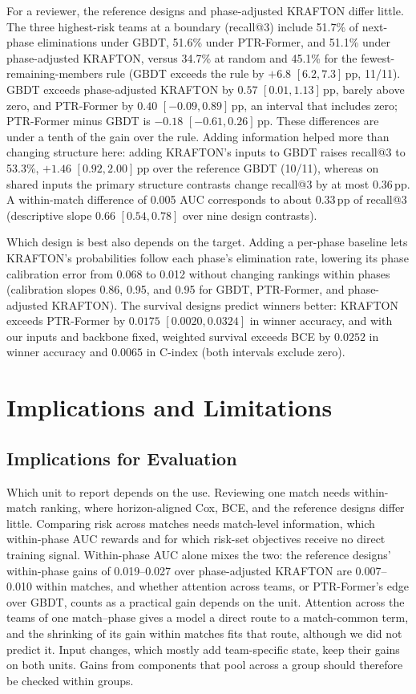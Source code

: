 \documentclass[sigconf,anonymous]{acmart}
\begin{document}
For a reviewer, the reference designs and phase-adjusted KRAFTON differ little. The three highest-risk teams at a boundary (recall@3) include 51.7\% of next-phase eliminations under GBDT, 51.6\% under PTR-Former, and 51.1\% under phase-adjusted KRAFTON, versus 34.7\% at random and 45.1\% for the fewest-remaining-members rule (GBDT exceeds the rule by $+6.8$ $[6.2,\allowbreak 7.3]$\,pp, 11/11). GBDT exceeds phase-adjusted KRAFTON by $0.57$ $[0.01,\allowbreak 1.13]$\,pp, barely above zero, and PTR-Former by $0.40$ $[-0.09,\allowbreak 0.89]$\,pp, an interval that includes zero; PTR-Former minus GBDT is $-0.18$ $[-0.61,\allowbreak 0.26]$\,pp. These differences are under a tenth of the gain over the rule. Adding information helped more than changing structure here: adding KRAFTON's inputs to GBDT raises recall@3 to 53.3\%, $+1.46$ $[0.92,\allowbreak 2.00]$\,pp over the reference GBDT (10/11), whereas on shared inputs the primary structure contrasts change recall@3 by at most 0.36\,pp. A within-match difference of 0.005 AUC corresponds to about 0.33\,pp of recall@3 (descriptive slope 0.66 $[0.54,\allowbreak 0.78]$ over nine design contrasts).

Which design is best also depends on the target. Adding a per-phase baseline lets KRAFTON's probabilities follow each phase's elimination rate, lowering its phase calibration error from 0.068 to 0.012 without changing rankings within phases (calibration slopes 0.86, 0.95, and 0.95 for GBDT, PTR-Former, and phase-adjusted KRAFTON). The survival designs predict winners better: KRAFTON exceeds PTR-Former by $0.0175$ $[0.0020,\allowbreak 0.0324]$ in winner accuracy, and with our inputs and backbone fixed, weighted survival exceeds BCE by $0.0252$ in winner accuracy and $0.0065$ in C-index (both intervals exclude zero).

\section{Implications and Limitations}
\label{sec:discussion}
\subsection{Implications for Evaluation}
\label{sec:discussion:implications}
Which unit to report depends on the use. Reviewing one match needs within-match ranking, where horizon-aligned Cox, BCE, and the reference designs differ little. Comparing risk across matches needs match-level information, which within-phase AUC rewards and for which risk-set objectives receive no direct training signal. Within-phase AUC alone mixes the two: the reference designs' within-phase gains of 0.019--0.027 over phase-adjusted KRAFTON are 0.007--0.010 within matches, and whether attention across teams, or PTR-Former's edge over GBDT, counts as a practical gain depends on the unit. Attention across the teams of one match--phase gives a model a direct route to a match-common term, and the shrinking of its gain within matches fits that route, although we did not predict it. Input changes, which mostly add team-specific state, keep their gains on both units. Gains from components that pool across a group should therefore be checked within groups.
\end{document}
